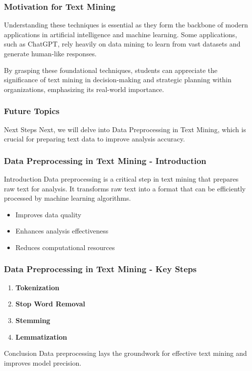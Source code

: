 \documentclass[aspectratio=169]{beamer}
\begin{document}
\begin{frame}[fragile]
    \frametitle{Motivation for Text Mining}
    Understanding these techniques is essential as they form the backbone of modern applications in artificial intelligence and machine learning. Some applications, such as ChatGPT, rely heavily on data mining to learn from vast datasets and generate human-like responses. 

    By grasping these foundational techniques, students can appreciate the significance of text mining in decision-making and strategic planning within organizations, emphasizing its real-world importance.
\end{frame}

\begin{frame}[fragile]
    \frametitle{Future Topics}
    \begin{block}{Next Steps}
        Next, we will delve into Data Preprocessing in Text Mining, which is crucial for preparing text data to improve analysis accuracy.
    \end{block}
\end{frame}

\begin{frame}[fragile]
    \frametitle{Data Preprocessing in Text Mining - Introduction}
    \begin{block}{Introduction}
        Data preprocessing is a critical step in text mining that prepares raw text for analysis. It transforms raw text into a format that can be efficiently processed by machine learning algorithms.
    \end{block}
    
    \begin{itemize}
        \item Improves data quality
        \item Enhances analysis effectiveness
        \item Reduces computational resources
    \end{itemize}
\end{frame}

\begin{frame}[fragile]
    \frametitle{Data Preprocessing in Text Mining - Key Steps}

    \begin{enumerate}
        \item \textbf{Tokenization}
        \item \textbf{Stop Word Removal}
        \item \textbf{Stemming}
        \item \textbf{Lemmatization}
    \end{enumerate}
    
    \begin{block}{Conclusion}
        Data preprocessing lays the groundwork for effective text mining and improves model precision.
    \end{block}
\end{frame}
\end{document}
